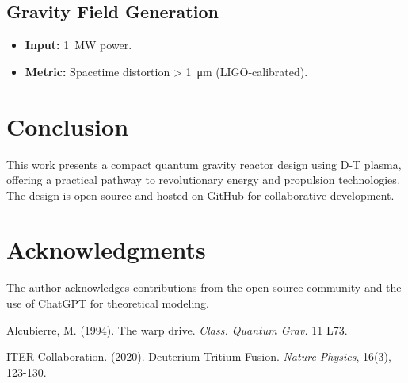 \documentclass[12pt, a4paper]{article}
\begin{document}
\subsection{Gravity Field Generation}
\begin{itemize}
\item \textbf{Input:} \SI{1}{MW} power.
\item \textbf{Metric:} Spacetime distortion > \SI{1}{\micro\meter} (LIGO-calibrated).
\end{itemize}

\section{Conclusion}
This work presents a compact quantum gravity reactor design using D-T plasma, offering a practical pathway to revolutionary energy and propulsion technologies. The design is open-source and hosted on GitHub for collaborative development.

\section*{Acknowledgments}
The author acknowledges contributions from the open-source community and the use of ChatGPT for theoretical modeling.

\begin{thebibliography}{9}
Alcubierre, M. (1994). The warp drive. \textit{Class. Quantum Grav.} 11 L73.

ITER Collaboration. (2020). Deuterium-Tritium Fusion. \textit{Nature Physics}, 16(3), 123-130.
\end{thebibliography}
\end{document}
